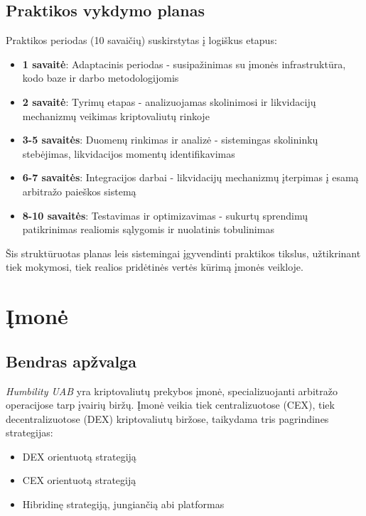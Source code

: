 \documentclass[]{VUMIFTemplateClass}
\begin{document}
\subsection*{Praktikos vykdymo planas}
Praktikos periodas (10 savaičių) suskirstytas į logiškus etapus:

\begin{itemize}
\item \textbf{1 savaitė}: Adaptacinis periodas - susipažinimas su įmonės infrastruktūra, kodo baze ir darbo metodologijomis

\item \textbf{2 savaitė}: Tyrimų etapas - analizuojamas skolinimosi ir likvidacijų mechanizmų veikimas kriptovaliutų rinkoje

\item \textbf{3-5 savaitės}: Duomenų rinkimas ir analizė - sistemingas skolininkų stebėjimas, likvidacijos momentų identifikavimas

\item \textbf{6-7 savaitės}: Integracijos darbai - likvidacijų mechanizmų įterpimas į esamą arbitražo paieškos sistemą

\item \textbf{8-10 savaitės}: Testavimas ir optimizavimas - sukurtų sprendimų patikrinimas realiomis sąlygomis ir nuolatinis tobulinimas
\end{itemize}

Šis struktūruotas planas leis sistemingai įgyvendinti praktikos tikslus, užtikrinant tiek mokymosi, tiek realios pridėtinės vertės kūrimą įmonės veikloje.

\section{Įmonė}

\subsection{Bendras apžvalga}
\textit{Humbility UAB} yra kriptovaliutų prekybos įmonė, specializuojanti arbitražo operacijose tarp įvairių biržų. Įmonė veikia tiek centralizuotose (CEX), tiek decentralizuotose (DEX) kriptovaliutų biržose, taikydama tris pagrindines strategijas:
\begin{itemize}
\item DEX orientuotą strategiją
\item CEX orientuotą strategiją
\item Hibridinę strategiją, jungiančią abi platformas
\end{itemize}
\end{document}

